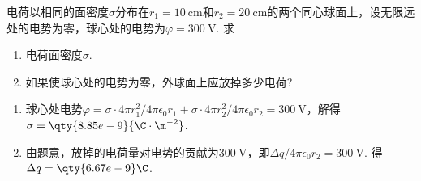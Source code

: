 \begin{problem}
    电荷以相同的面密度$\sigma$分布在$r_1=\qty{10}\cm$和$r_2=\qty{20}\cm$的两个同心球面上，设无限远处的电势为零，球心处的电势为$\varphi=\qty{300}\V$. 求
    \begin{enumerate}
        \item 电荷面密度$\sigma$.
        \item 如果使球心处的电势为零，外球面上应放掉多少电荷?
    \end{enumerate}
\end{problem}
\begin{solution}\leavevmode
    \begin{enumerate}
        \item 球心处电势$\displaystyle\varphi=\sigma\cdot 4\pi r_1^2/4\pi\epsilon_0r_1+\sigma\cdot 4\pi r_2^2/4\pi\epsilon_0r_2=\qty{300}\V$，解得$\sigma=\qty{8.85e-9}{\C\cdot\m^{-2}}$.
        \item 由题意，放掉的电荷量对电势的贡献为$\qty{300}\V$，即$\Delta q/4\pi\epsilon_0r_2=\qty{300}\V$. 得$\Delta q=\qty{6.67e-9}\C$.
    \end{enumerate}
\end{solution}